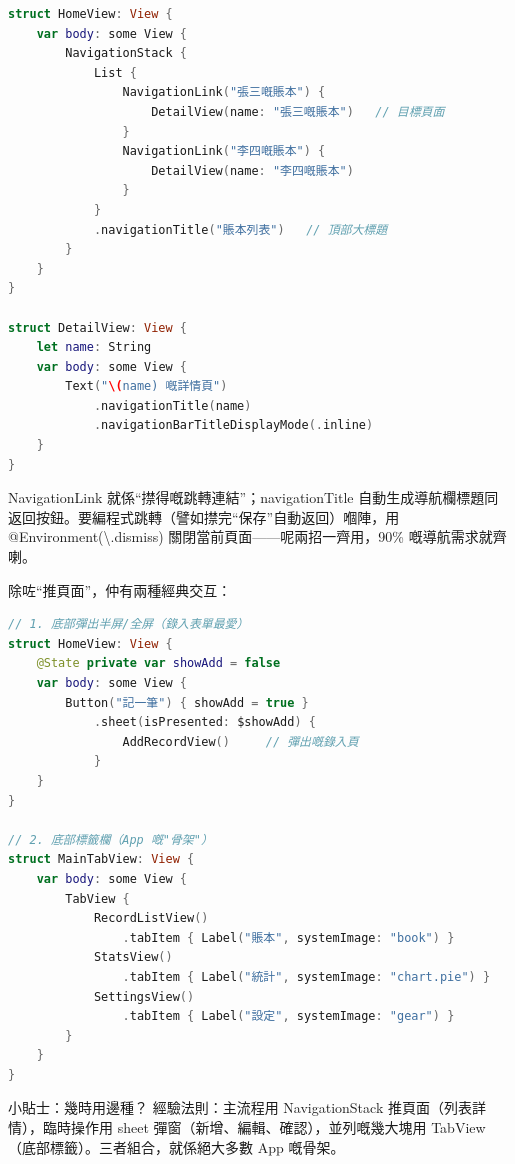 \begin{lstlisting}[language=Swift]
struct HomeView: View {
    var body: some View {
        NavigationStack {
            List {
                NavigationLink("張三嘅賬本") {
                    DetailView(name: "張三嘅賬本")   // 目標頁面
                }
                NavigationLink("李四嘅賬本") {
                    DetailView(name: "李四嘅賬本")
                }
            }
            .navigationTitle("賬本列表")   // 頂部大標題
        }
    }
}

struct DetailView: View {
    let name: String
    var body: some View {
        Text("\(name) 嘅詳情頁")
            .navigationTitle(name)
            .navigationBarTitleDisplayMode(.inline)
    }
}
\end{lstlisting}

NavigationLink 就係“㩒得嘅跳轉連結”；navigationTitle 自動生成導航欄標題同返回按鈕。要編程式跳轉（譬如㩒完“保存”自動返回）嗰陣，用 @Environment(\textbackslash{}.dismiss) 關閉當前頁面——呢兩招一齊用，90\% 嘅導航需求就齊喇。


除咗“推頁面”，仲有兩種經典交互：

\begin{lstlisting}[language=Swift]
// 1. 底部彈出半屏/全屏（錄入表單最愛）
struct HomeView: View {
    @State private var showAdd = false
    var body: some View {
        Button("記一筆") { showAdd = true }
            .sheet(isPresented: $showAdd) {
                AddRecordView()     // 彈出嘅錄入頁
            }
    }
}

// 2. 底部標籤欄（App 嘅"骨架"）
struct MainTabView: View {
    var body: some View {
        TabView {
            RecordListView()
                .tabItem { Label("賬本", systemImage: "book") }
            StatsView()
                .tabItem { Label("統計", systemImage: "chart.pie") }
            SettingsView()
                .tabItem { Label("設定", systemImage: "gear") }
        }
    }
}
\end{lstlisting}

\begin{tcbinfo}{小貼士：幾時用邊種？}
經驗法則：主流程用 NavigationStack 推頁面（列表詳情），臨時操作用 sheet 彈窗（新增、編輯、確認），並列嘅幾大塊用 TabView（底部標籤）。三者組合，就係絕大多數 App 嘅骨架。

\end{tcbinfo}


